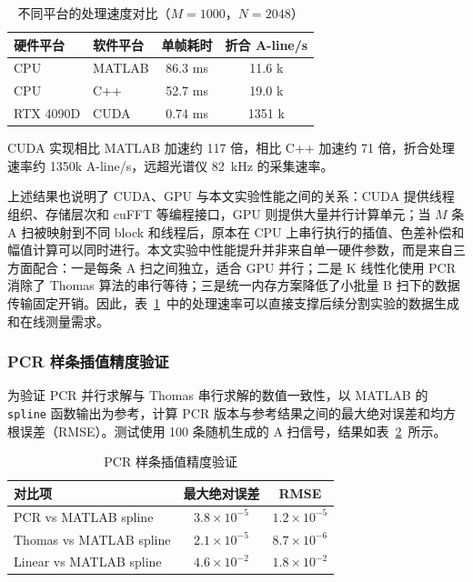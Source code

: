 \begin{table}[htbp]
\centering
\caption{不同平台的处理速度对比（$M = 1000$，$N = 2048$）}
\label{tab:cpu_gpu_compare}
\begin{tabular}{llcc}
\toprule
硬件平台 & 软件平台 & 单帧耗时 & 折合 A-line/s \\
\midrule
CPU & MATLAB & 86.3 ms & 11.6 k \\
CPU & C++ & 52.7 ms & 19.0 k \\
RTX 4090D & CUDA & 0.74 ms & 1351 k \\
\bottomrule
\end{tabular}
\end{table}

CUDA 实现相比 MATLAB 加速约 117 倍，相比 C++ 加速约 71 倍，折合处理速率约 1350k A-line/s，远超光谱仪 82~kHz 的采集速率。

上述结果也说明了 CUDA、GPU 与本文实验性能之间的关系：CUDA 提供线程组织、存储层次和 cuFFT 等编程接口，GPU 则提供大量并行计算单元；当 $M$ 条 A 扫被映射到不同 block 和线程后，原本在 CPU 上串行执行的插值、色差补偿和幅值计算可以同时进行。本文实验中性能提升并非来自单一硬件参数，而是来自三方面配合：一是每条 A 扫之间独立，适合 GPU 并行；二是 K 线性化使用 PCR 消除了 Thomas 算法的串行等待；三是统一内存方案降低了小批量 B 扫下的数据传输固定开销。因此，表~\ref{tab:cpu_gpu_compare}~中的处理速率可以直接支撑后续分割实验的数据生成和在线测量需求。

\subsubsection{PCR 样条插值精度验证}

为验证 PCR 并行求解与 Thomas 串行求解的数值一致性，以 MATLAB 的 \texttt{spline} 函数输出为参考，计算 PCR 版本与参考结果之间的最大绝对误差和均方根误差（RMSE）。测试使用 100 条随机生成的 A 扫信号，结果如表~\ref{tab:pcr_accuracy}~所示。

\begin{table}[htbp]
\centering
\caption{PCR 样条插值精度验证}
\label{tab:pcr_accuracy}
\begin{tabular}{lcc}
\toprule
对比项 & 最大绝对误差 & RMSE \\
\midrule
PCR vs MATLAB spline & $3.8 \times 10^{-5}$ & $1.2 \times 10^{-5}$ \\
Thomas vs MATLAB spline & $2.1 \times 10^{-5}$ & $8.7 \times 10^{-6}$ \\
Linear vs MATLAB spline & $4.6 \times 10^{-2}$ & $1.8 \times 10^{-2}$ \\
\bottomrule
\end{tabular}
\end{table}

